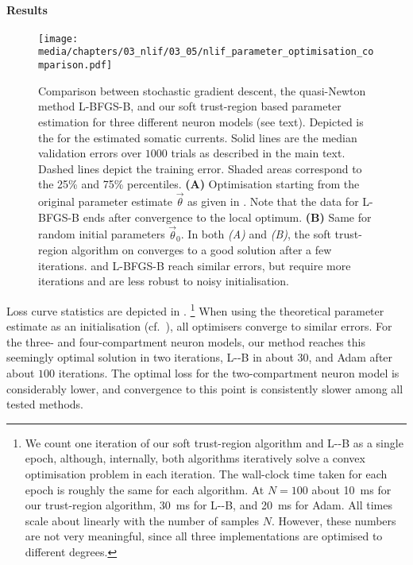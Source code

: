 \paragraph{Results}

\begin{figure}
	\texttt{[image: media/chapters/03\_nlif/03\_05/nlif\_parameter\_optimisation\_comparison.pdf]}%
	{\label{fig:nlif_parameter_optimisation_comparison_a}}%
	{\label{fig:nlif_parameter_optimisation_comparison_b}}%
	\caption[Comparing different optimisers performing parameter optimisation]{Comparison between stochastic gradient descent, the quasi-Newton method L-BFGS-B, and our soft trust-region based parameter estimation for three different neuron models (see text).
	Depicted is the \NRMSE for the estimated somatic currents.
	Solid lines are the median validation errors over $1000$ trials as described in the main text.
	Dashed lines depict the training error.
	Shaded areas correspond to the 25\% and 75\% percentiles.
	\textbf{(A)} Optimisation starting from the original parameter estimate $\vec \theta$ as given in .
	Note that the data for L-BFGS-B ends after convergence to the local optimum.
	\textbf{(B)} Same for random initial parameters $\vec \theta_0$.
	In both \emph{(A)} and \emph{(B)}, the soft trust-region algorithm on converges to a good solution after a few iterations.
	\SGD and L-BFGS-B reach similar errors, but require more iterations and are less robust to noisy initialisation.
	}
	\label{fig:nlif_parameter_optimisation_comparison}
\end{figure}

Loss curve statistics are depicted in .%
\footnote{
We count one iteration of our soft trust-region algorithm and L-\BFGS-B as a single epoch, although, internally, both algorithms iteratively solve a convex optimisation problem in each iteration.
The wall-clock time taken for each epoch is roughly the same for each algorithm.
At $N = 100$ about \SI{10}{\milli\second} for our trust-region algorithm, \SI{30}{\milli\second} for L-\BFGS-B, and \SI{20}{\milli\second} for Adam.
All times scale about linearly with the number of samples $N$.
However, these numbers are not very meaningful, since all three implementations are optimised to different degrees.
}
When using the theoretical parameter estimate as an initialisation (cf.~), all optimisers converge to similar errors.
For the three- and four-compartment neuron models, our method reaches this seemingly optimal solution in two iterations, L-\BFGS-B in about $30$, and Adam after about $100$ iterations.
The optimal loss for the two-compartment neuron model is considerably lower, and convergence to this point is consistently slower among all tested methods.

